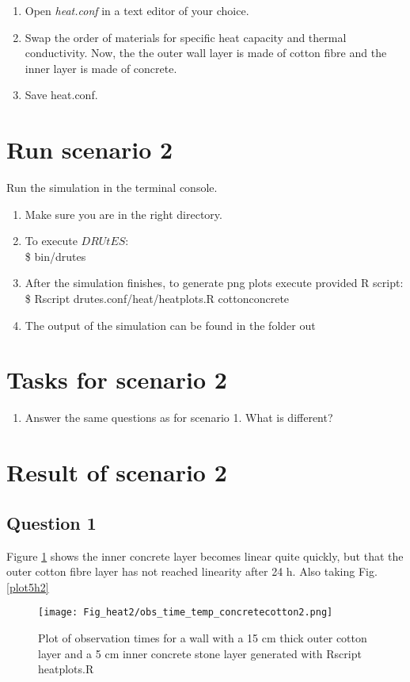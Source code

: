 \begin{enumerate}
\item Open \emph{heat.conf} in a text editor of your choice. 
\item Swap the order of materials for specific heat capacity and thermal conductivity. Now, the the outer wall layer is made of cotton fibre and the inner layer is made of concrete.
\item Save heat.conf.
\end{enumerate}

\section*{Run scenario 2}
Run the simulation in the terminal console.
\begin{enumerate}
\item Make sure you are in the right directory. 
\item To execute $DRUtES$: \\
\$ bin/drutes
\item After the simulation finishes, to generate png plots execute provided R script: \\
\$ Rscript drutes.conf/heat/heatplots.R cottonconcrete
\item The output of the simulation can be found in the folder out

\end{enumerate}

\section*{Tasks for scenario 2}

\begin{enumerate}
\item Answer the same questions as for scenario 1. What is different?
\end{enumerate}

\section*{Result of scenario 2}
\subsection*{Question 1}
Figure \ref{plot4h} shows the inner concrete layer becomes linear quite quickly, but that the outer cotton fibre layer has not reached linearity after 24 h. Also taking Fig. \ref{plot5h2} 
\begin{figure}[!h]
\centering
\texttt{[image: Fig\_heat2/obs\_time\_temp\_concretecotton2.png]}
\caption{\label{plot4h}Plot of observation times for a wall with a 15 cm thick outer cotton layer and a 5 cm inner concrete stone layer generated with Rscript heatplots.R}
\end{figure}

